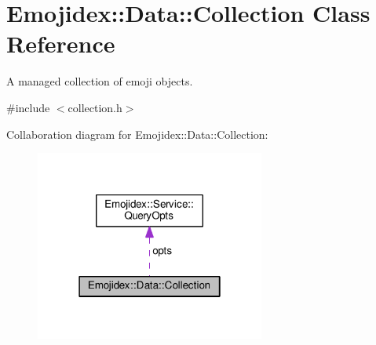 \hypertarget{classEmojidex_1_1Data_1_1Collection}{}\section{Emojidex\+:\+:Data\+:\+:Collection Class Reference}
\label{classEmojidex_1_1Data_1_1Collection}


A managed collection of emoji objects.  




{\ttfamily \#include $<$collection.\+h$>$}



Collaboration diagram for Emojidex\+:\+:Data\+:\+:Collection\+:\nopagebreak
\begin{figure}[H]
\begin{center}
\leavevmode
\includegraphics[width=214pt]{classEmojidex_1_1Data_1_1Collection__coll__graph}
\end{center}
\end{figure}
